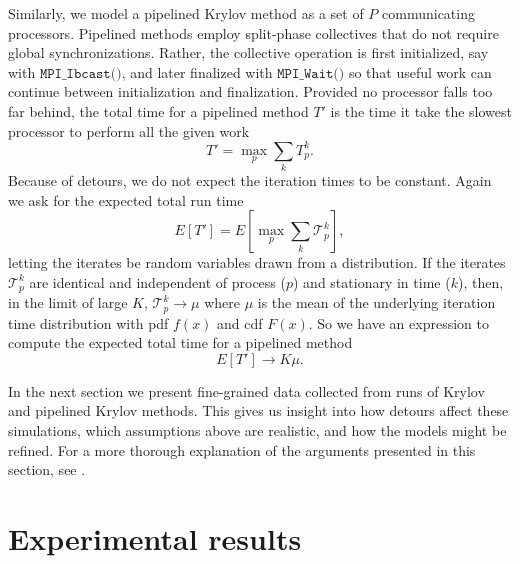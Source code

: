 \documentclass[num-refs]{wiley-article}
\begin{document}
Similarly, we model a pipelined Krylov method as a set of $P$ communicating processors. Pipelined methods employ split-phase collectives that do not require global synchronizations. Rather, the collective operation is first initialized, say with  ${\texttt{MPI\_Ibcast()}}$, and later finalized with ${\texttt{MPI\_Wait()}}$ so that useful work can continue between initialization and finalization. 
Provided no processor falls too far behind, the total time for a pipelined method $T'$ is the time it take the slowest processor to perform all the given work 
\begin{equation}
T' = \max_p \sum_k T^k_p.
\end{equation}
Because of detours, we do not expect the iteration times to be constant. Again we ask for the expected total run time
\begin{equation}
E[T'] = E[\max_p \sum_k \mathcal{T}^k_p], \label{eq:pipeline-expression}
\end{equation}
letting the iterates be random variables drawn from a distribution. 
If the iterates $\mathcal{T}^k_p$ are identical and independent of process ($p$) and stationary in time ($k$), then, in the limit of large $K$, $\mathcal{T}^k_p \rightarrow \mu$ where $\mu$ is the mean of the underlying iteration time distribution with pdf $f(x)$ and cdf $F(x)$. So we have an expression to compute the expected total time for a pipelined method
\begin{equation}
E[T'] \rightarrow K\mu. \label{eq:pipeline-model}
\end{equation}

In the next section we present fine-grained data collected from runs of Krylov and pipelined Krylov methods. This gives us insight into how detours affect these simulations, which assumptions above are realistic, and how the models might be refined. For a more thorough explanation of the arguments presented in this section, see \cite{morgan2016krylov}.

\section{Experimental results} \label{sec:experimental-results}
\end{document}
